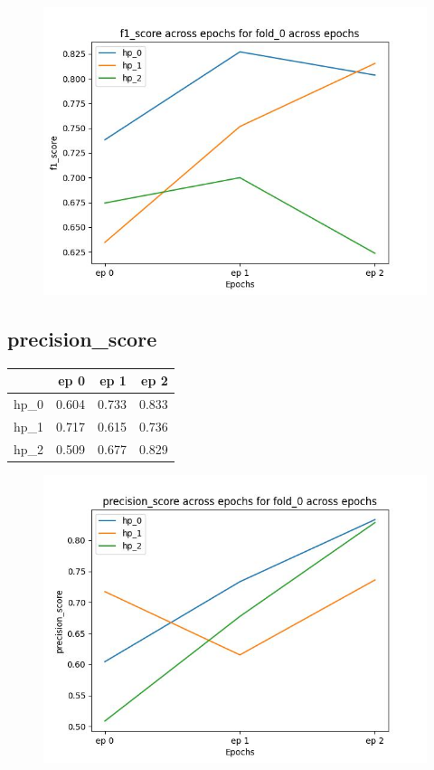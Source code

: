\documentclass{article}
\begin{document}
\begin{figure}[H]
\includegraphics[scale = 0.75]{fold_0/f1_score}
\end{figure}
\subsection{precision\_score}
\begin{tabular}{lrrr}
\toprule
{} &   ep 0 &   ep 1 &   ep 2 \\
\midrule
hp\_0 &  0.604 &  0.733 &  0.833 \\
hp\_1 &  0.717 &  0.615 &  0.736 \\
hp\_2 &  0.509 &  0.677 &  0.829 \\
\bottomrule
\end{tabular}

\begin{figure}[H]
\includegraphics[scale = 0.75]{fold_0/precision_score}
\end{figure}
\end{document}

